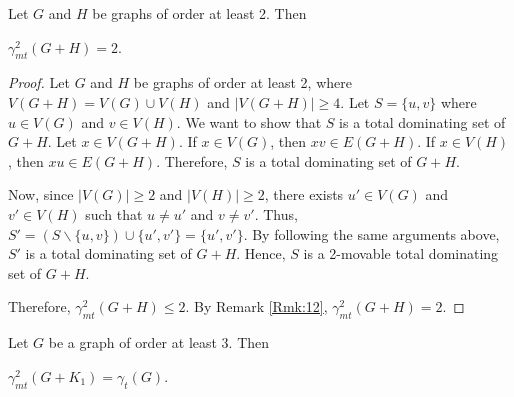 \documentclass[twoside,12pt]{article}
\begin{document}
\begin{theorem}\label{Thm:14}\rm
	Let $G$ and $H$ be graphs of order at least 2. Then
	\begin{center}
		$\gamma_{mt}^2 (G+H)=2$.
	\end{center}
\end{theorem}

\begin{proof}
	Let $G$ and $H$ be graphs of order at least 2, where $V(G+H) = V(G) \cup V(H)$ and $|V(G+H)| \geq 4$. Let $S=\{u,v\}$ where $u \in V(G)$ and $v \in V(H)$. We want to show that $S$ is a total dominating set of $G+H$. Let $x \in V(G+H)$. If $x \in V(G)$, then $xv \in E(G+H)$. If $x \in V(H)$, then $xu \in E(G+H)$. Therefore, $S$ is a total dominating set of $G+H$.
	
	Now, since $|V(G)| \geq 2$ and $|V(H)| \geq 2$, there exists $u' \in V(G)$ and $v' \in V(H)$ such that $u \not= u'$ and $v \not= v'$. Thus, $S'=(S \backslash \{u,v\}) \cup \{u',v'\} = \{u',v'\}$. By following the same arguments above, $S'$ is a total dominating set of $G+H$. Hence, $S$ is a 2-movable total dominating set of $G+H$.
	
	Therefore, $\gamma_{mt}^2 (G+H) \leq 2$. By Remark \ref{Rmk:12},  $\gamma_{mt}^2 (G+H) = 2$.
\end{proof}

\begin{theorem}\label{Thm:15}\rm
	Let $G$ be a graph of order at least 3. Then
	\begin{center}
		$\gamma_{mt}^2 (G+K_1)=\gamma_t (G)$.
	\end{center}
\end{theorem}
\end{document}

